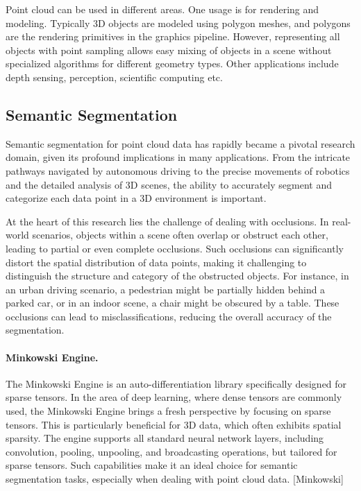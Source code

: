 \documentclass[11pt, a4paper,oneside,chapterprefix=false]{scrbook}
\begin{document}
\vspace{10pt}

Point cloud can be used in different areas. One usage is for rendering and modeling. Typically 3D objects are modeled using polygon meshes, and  polygons are the rendering primitives in the graphics pipeline. However, representing all objects with point sampling allows easy mixing of objects in a scene without specialized algorithms for different geometry types. Other applications include depth sensing, perception, scientific computing etc.

\subsection{Semantic Segmentation}

Semantic segmentation for point cloud data has rapidly became a pivotal research domain, given its profound implications in many applications. From the intricate pathways navigated by autonomous driving to the precise movements of robotics and the detailed analysis of 3D scenes, the ability to accurately segment and categorize each data point in a 3D environment is important.

\vspace{10pt}

At the heart of this research lies the challenge of dealing with occlusions. In real-world scenarios, objects within a scene often overlap or obstruct each other, leading to partial or even complete occlusions. Such occlusions can significantly distort the spatial distribution of data points, making it challenging to distinguish the structure and category of the obstructed objects. For instance, in an urban driving scenario, a pedestrian might be partially hidden behind a parked car, or in an indoor scene, a chair might be obscured by a table. These occlusions can lead to misclassifications, reducing the overall accuracy of the segmentation.


\paragraph{Minkowski Engine.}

The Minkowski Engine is an auto-differentiation library specifically designed for sparse tensors. In the area of deep learning, where dense tensors are commonly used, the Minkowski Engine brings a fresh perspective by focusing on sparse tensors. This is particularly beneficial for 3D data, which often exhibits spatial sparsity. The engine supports all standard neural network layers, including convolution, pooling, unpooling, and broadcasting operations, but tailored for sparse tensors. Such capabilities make it an ideal choice for semantic segmentation tasks, especially when dealing with point cloud data. [Minkowski]
\end{document}
